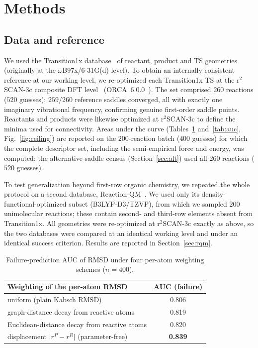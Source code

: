 \documentclass[11pt]{article}
\begin{document}
\section{Methods}

\subsection{Data and reference}
We used the Transition1x database~\cite{Schreiner2022} of reactant, product and
TS geometries (originally at the $\omega$B97x/6-31G(d) level). To
obtain an internally consistent reference at our working level, we re-optimized
each Transition1x TS at the r$^2$SCAN-3c composite DFT
level~\cite{Grimme2021} (ORCA~6.0.0~\cite{Neese2025}). The set comprised $260$
reactions ($520$ guesses); $259/260$ reference saddles converged, all with exactly
one imaginary vibrational frequency, confirming genuine first-order saddle points.
Reactants and products were likewise optimized at r$^2$SCAN-3c to
define the minima used for connectivity. Areas under the curve
(Tables~\ref{tab:weights} and~\ref{tab:auc}, Fig.~\ref{fig:ceiling}) are reported
on the $200$-reaction batch ($400$ guesses) for which the complete descriptor set,
including the semi-empirical force and energy, was computed; the alternative-saddle census
(Section~\ref{sec:alt}) used all $260$ reactions ($520$ guesses).

To test generalization beyond first-row organic chemistry, we repeated the whole
protocol on a second database, Reaction-QM~\cite{ReactionQM2026}. We used only its
density-functional-optimized subset (B3LYP-D3/TZVP), from which we sampled $200$
unimolecular reactions; these contain second- and third-row elements absent from
Transition1x. All geometries were re-optimized at r$^2$SCAN-3c exactly as above, so
the two databases were compared at an identical working level and under an
identical success criterion. Results are reported in Section~\ref{sec:rqm}.

\begin{table}[t]
\centering
\caption{Failure-prediction AUC of RMSD under four per-atom weighting schemes
($n=400$).}
\label{tab:weights}
\begin{tabular}{lc}
\toprule
Weighting of the per-atom RMSD & AUC (failure) \\
\midrule
uniform (plain Kabsch RMSD) & 0.806 \\
graph-distance decay from reactive atoms & 0.819 \\
Euclidean-distance decay from reactive atoms & 0.820 \\
displacement $\lvert r^{P}-r^{R}\rvert$ (parameter-free) & \textbf{0.839} \\
\bottomrule
\end{tabular}
\end{table}
\end{document}
